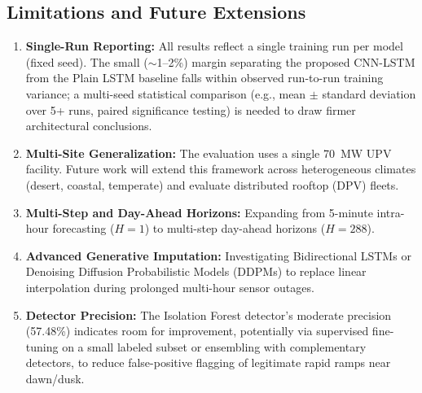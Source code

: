 \documentclass[conference]{IEEEtran}
\begin{document}
\subsection*{Limitations and Future Extensions}
\begin{enumerate}
    \item \textbf{Single-Run Reporting:} All results reflect a single training run per model (fixed seed). The small ($\sim$1--2\%) margin separating the proposed CNN-LSTM from the Plain LSTM baseline falls within observed run-to-run training variance; a multi-seed statistical comparison (e.g., mean $\pm$ standard deviation over 5+ runs, paired significance testing) is needed to draw firmer architectural conclusions.
    \item \textbf{Multi-Site Generalization:} The evaluation uses a single 70~MW UPV facility. Future work will extend this framework across heterogeneous climates (desert, coastal, temperate) and evaluate distributed rooftop (DPV) fleets.
    \item \textbf{Multi-Step and Day-Ahead Horizons:} Expanding from 5-minute intra-hour forecasting ($H=1$) to multi-step day-ahead horizons ($H=288$).
    \item \textbf{Advanced Generative Imputation:} Investigating Bidirectional LSTMs or Denoising Diffusion Probabilistic Models (DDPMs) to replace linear interpolation during prolonged multi-hour sensor outages.
    \item \textbf{Detector Precision:} The Isolation Forest detector's moderate precision (57.48\%) indicates room for improvement, potentially via supervised fine-tuning on a small labeled subset or ensembling with complementary detectors, to reduce false-positive flagging of legitimate rapid ramps near dawn/dusk.
\end{enumerate}
\end{document}
